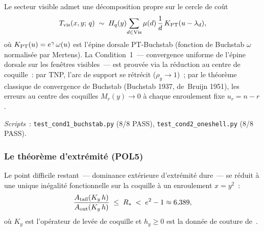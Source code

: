 \documentclass[12pt,a4paper]{article}
\begin{document}
Le secteur visible admet une décomposition propre sur le cercle
de coût
\begin{equation}
  T_{\rm vis}(x,y;\,q)
  \;\sim\; H_q(y)\!\sum_{d \in \mathrm{Vis}} \mu(d)\,
  \frac{1}{d}\,K_{\rm PT}(u - \lambda_d),
  \label{eq:visible_backbone}
\end{equation}
où $K_{\rm PT}(u) = e^\gamma\,\omega(u)$ est l'épine dorsale
PT-Buchstab (fonction de Buchstab $\omega$ normalisée par
Mertens). La Condition~1~--- convergence uniforme de l'épine
dorsale sur les fenêtres visibles~--- est prouvée via la
réduction au centre de coquille~: par TNP, l'arc de support se
rétrécit ($\rho_y \to 1$)~; par le théorème classique de
convergence de Buchstab (Buchstab 1937, de~Bruijn 1951), les
erreurs au centre des coquilles $M_r(y)\to 0$ à chaque
enroulement fixe $u_r = n - r$.

\medskip\noindent
\textit{Scripts}~:
\texttt{test\_cond1\_buchstab.py} (8/8 PASS),
\texttt{test\_cond2\_oneshell.py} (8/8 PASS).

\subsubsection{Le théorème d'extrémité (POL5)}
\label{sec:ch9_POL5}

Le point difficile restant~--- dominance extérieure d'extrémité
dure~--- se réduit à une unique inégalité fonctionnelle sur la
coquille à un enroulement $x = y^2$~:
\begin{equation}
  \frac{A_{\rm tail}(K_y\,h)}{A_{\rm out}(K_y\,h)}
  \;\leq\; R_*
  \;<\; e^2 - 1 \approx 6{,}389,
  \label{eq:POL5}
\end{equation}
où $K_y$ est l'opérateur de levée de coquille et $h_y \geq 0$
est la donnée de couture de~\cite{companion_M3}.
\end{document}
